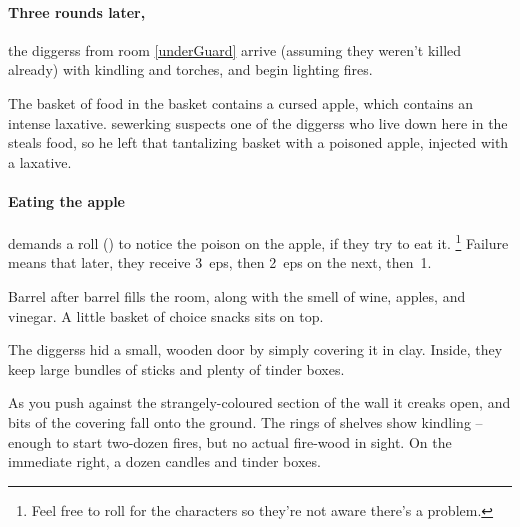 \begin{multicols}{2}
\sewerking



\paragraph{Three rounds later,}
the \glspl{diggers} from room \ref{underGuard} arrive (assuming they weren't killed already) with kindling and torches, and begin lighting fires.


\begin{exampletext}
  The basket of food in the basket contains a cursed apple, which contains an intense laxative.
  \Gls{sewerking} suspects one of the \glspl{diggers} who live down here in the  steals food, so he left that tantalizing basket with a poisoned apple, injected with a laxative.
\end{exampletext}

\paragraph{Eating the apple}
demands a  roll (\tn[11]) to notice the poison on the apple, if they try to eat it.%
\footnote{Feel free to roll for the characters so they're not aware there's a problem.}
Failure means that  later, they receive 3~\glspl{ep}, then 2~\glspl{ep} on the next, then~1.

\begin{boxtext}
  Barrel after barrel fills the room, along with the smell of wine, apples, and vinegar.
  A little basket of choice snacks sits on top.
\end{boxtext}


The \glspl{diggers} hid a small, wooden door by simply covering it in clay.
Inside, they keep large bundles of sticks and plenty of tinder boxes.

\begin{boxtext}
  As you push against the strangely-coloured section of the wall it creaks open, and bits of the covering fall onto the ground.
  The rings of shelves show kindling -- enough to start two-dozen fires, but no actual fire-wood in sight.
  On the immediate right, a dozen candles and tinder boxes.
\end{boxtext}


\end{multicols}
